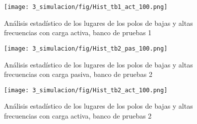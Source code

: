 \begin{figure}
    \centering
    \texttt{[image: 3\_simulacion/fig/Hist\_tb1\_act\_100.png]}
    \caption{Análisis estadístico de los lugares de los polos de bajas y altas frecuencias con carga activa, banco de pruebas 1}
\end{figure}

\begin{figure}
    \centering
    \texttt{[image: 3\_simulacion/fig/Hist\_tb2\_pas\_100.png]}
    \caption{Análisis estadístico de los lugares de los polos de bajas y altas frecuencias con carga pasiva, banco de pruebas 2}
\end{figure}

\begin{figure}
    \centering
    \texttt{[image: 3\_simulacion/fig/Hist\_tb2\_act\_100.png]}
    \caption{Análisis estadístico de los lugares de los polos de bajas y altas frecuencias con carga activa, banco de pruebas 2}
\end{figure}
